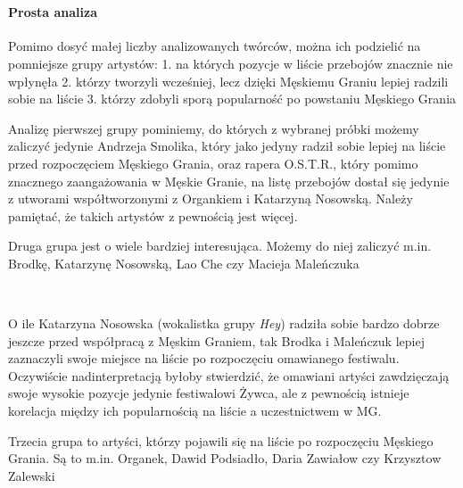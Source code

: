 \documentclass[11pt]{article}
\begin{document}
    \begin{center}
    \end{center}
    { \hspace*{\fill} \\}
    
    \hypertarget{prosta-analiza}{%
\paragraph{Prosta analiza}\label{prosta-analiza}}

Pomimo dosyć małej liczby analizowanych twórców, można ich podzielić na
pomniejsze grupy artystów: 1. na których pozycje w liście przebojów
znacznie nie wpłynęła 2. którzy tworzyli wcześniej, lecz dzięki Męskiemu
Graniu lepiej radzili sobie na liście 3. którzy zdobyli sporą
popularność po powstaniu Męskiego Grania

Analizę pierwszej grupy pominiemy, do których z wybranej próbki możemy
zaliczyć jedynie Andrzeja Smolika, który jako jedyny radził sobie lepiej
na liście przed rozpoczęciem Męskiego Grania, oraz rapera O.S.T.R.,
który pomimo znacznego zaangażowania w Męskie Granie, na listę przebojów
dostał się jedynie z utworami współtworzonymi z Organkiem i Katarzyną
Nosowską. Należy pamiętać, że takich artystów z pewnością jest więcej.

Druga grupa jest o wiele bardziej interesująca. Możemy do niej zaliczyć
m.in. Brodkę, Katarzynę Nosowską, Lao Che czy Macieja Maleńczuka

    \begin{center}
    \end{center}
    { \hspace*{\fill} \\}
    
    O ile Katarzyna Nosowska (wokalistka grupy \emph{Hey}) radziła sobie
bardzo dobrze jeszcze przed współpracą z Męskim Graniem, tak Brodka i
Maleńczuk lepiej zaznaczyli swoje miejsce na liście po rozpoczęciu
omawianego festiwalu. Oczywiście nadinterpretacją byłoby stwierdzić, że
omawiani artyści zawdzięczają swoje wysokie pozycje jedynie festiwalowi
Żywca, ale z pewnością istnieje korelacja między ich popularnością na
liście a uczestnictwem w MG.

Trzecia grupa to artyści, którzy pojawili się na liście po rozpoczęciu
Męskiego Grania. Są to m.in. Organek, Dawid Podsiadło, Daria Zawiałow
czy Krzysztow Zalewski
\end{document}
